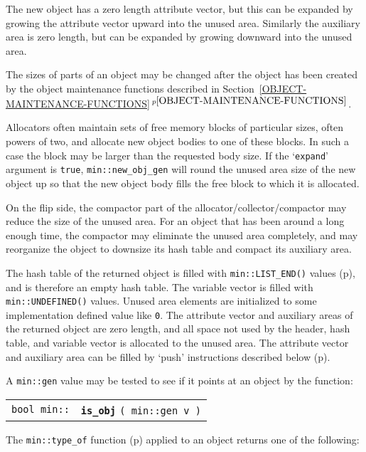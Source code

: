 \documentclass[12pt]{article}
\makeatletter
\newcommand{\TT}[1]{{\tt \bfseries #1}}
\newcommand{\ttindex}[1]{\index{#1@{\tt #1}}}
\newcommand{\itemref}[1]{\ref{#1}$\,^{p\pageref{#1}}$}
\newcommand{\pagref}[1]{p\pageref{#1}}
\newcommand{\EOL}{\penalty \exhyphenpenalty}
\newenvironment{indpar}[1][0.3in]%
	{\begin{list}{}%
		     {\setlength{\itemsep}{0in}%
		      \setlength{\topsep}{0in}%
		      \setlength{\parsep}{1ex}%
		      \setlength{\labelwidth}{#1}%
		      \setlength{\leftmargin}{#1}%
		      \addtolength{\leftmargin}{\labelsep}}%
	 \item}%
	{\end{list}}
\newcommand{\LABEL}[1]{\label{#1}}
\newcommand{\MINKEY}[1]%
	   {\TT{#1}\ttindex{min::#1}\ttindex{#1}}
\makeatother
\begin{document}
The new object has a zero length attribute vector, but this can be
expanded by growing the attribute vector upward into the unused area.
Similarly the auxiliary area is zero length, but can be expanded by
growing downward into the unused area.

The sizes of parts of an object may be changed after the object has
been created by the object maintenance functions
described in Section~\itemref{OBJECT-MAINTENANCE-FUNCTIONS}.

Allocators often maintain sets of free memory blocks of particular
sizes, often powers of two, and allocate new object bodies to one
of these blocks.  In such a case the block may be larger than the
requested body size.  If the `{\tt expand}' argument is {\tt true},
{\tt min::\EOL new\_\EOL obj\_\EOL gen} will round the unused area
size of the new object up so that the new object body fills the
free block to which it is allocated.

On the flip side, the compactor part of the
allocator/\EOL collector/\EOL compactor
may reduce the size of the unused
area.  For an object that has been around a long enough time, the
compactor may eliminate the unused area completely, and may reorganize
the object to downsize its hash table and compact its auxiliary area.

The hash table of the returned object is filled with \verb|min::LIST_END()|
values (\pagref{MIN::LIST_END}), and is therefore an empty hash table.
The variable vector is filled with \verb|min::UNDEFINED()| values.
Unused area elements are initialized to some implementation defined
value like \verb|0|.
The attribute vector and auxiliary areas of the returned object are
zero length, and all space not used by the header, hash table, and
variable vector is allocated to the unused area.
The attribute vector and auxiliary area can be
filled by `push' instructions described below
(\pagref{OBJECT_PUSH_FUNCTIONS}).

A \verb|min::gen| value may be tested to see if it points at an
object by the function:

\begin{indpar}\begin{tabular}{r@{}l}
\verb|bool min::| & \MINKEY{is\_obj} \verb|( min::gen v )|
\LABEL{MIN::IS_OBJ} \\
\end{tabular}\end{indpar}

The {\tt min::type\_of} function (\pagref{MIN::TYPE_OF_GEN})
applied to an object returns one of the following:
\end{document}
